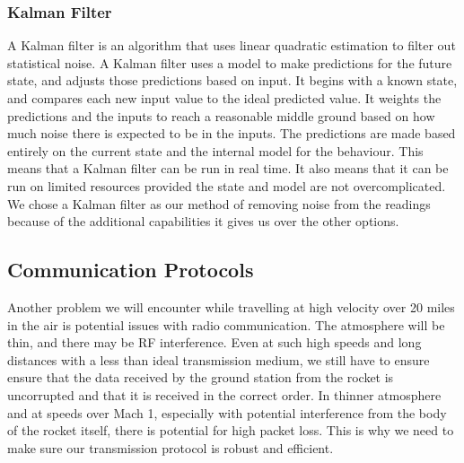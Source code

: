 \documentclass[onecolumn, draftclsnofoot,10pt, compsoc]{IEEEtran}
\begin{document}
\subsubsection{Kalman Filter}
A Kalman filter is an algorithm that uses linear quadratic estimation to filter out statistical noise.
A Kalman filter uses a model to make predictions for the future state, and adjusts those predictions based on input.
It begins with a known state, and compares each new input value to the ideal predicted value.
It weights the predictions and the inputs to reach a reasonable middle ground based on how much noise there is expected to be in the inputs.
The predictions are made based entirely on the current state and the internal model for the behaviour.
This means that a Kalman filter can be run in real time.
It also means that it can be run on limited resources provided the state and model are not overcomplicated.
We chose a Kalman filter as our method of removing noise from the readings because of the additional capabilities it gives us over the other options.

\subsection{Communication Protocols}
Another problem we will encounter while travelling at high velocity over 20 miles in the air is potential issues with radio communication.
The atmosphere will be thin, and there may be RF interference.
Even at such high speeds and long distances with a less than ideal transmission medium, we still have to ensure ensure that the data received by the ground station from the rocket is uncorrupted and that it is received in the correct order.
In thinner atmosphere and at speeds over Mach 1, especially with potential interference from the body of the rocket itself, there is potential for high packet loss.
This is why we need to make sure our transmission protocol is robust and efficient.
\end{document}
